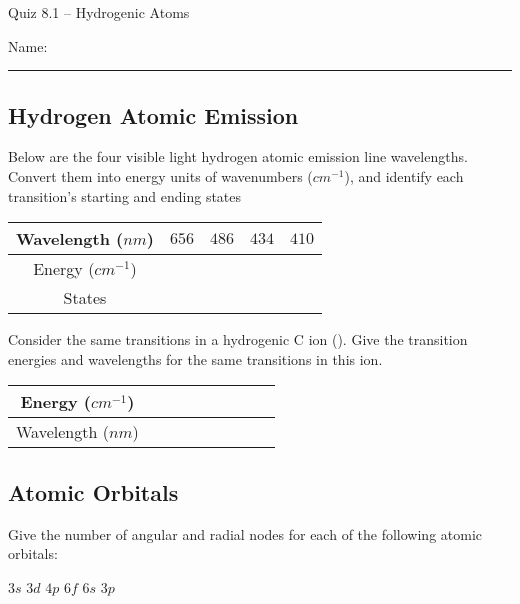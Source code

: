 \documentclass[11pt, letterpaper]{memoir}
\begin{document}
	\begin{center}
		{\large Quiz 8.1 --	Hydrogenic Atoms}
	\end{center}
	{\large Name: \rule[-1mm]{4in}{.1pt} 

\subsection*{Hydrogen Atomic Emission}

Below are the four visible light hydrogen atomic emission line wavelengths. Convert them into energy units of wavenumbers ($cm^{-1}$), and identify each transition's starting and ending states

\begin{tabular}{c|c|c|c|c}
	Wavelength ($nm$) & $656$ & $486$ & $434$ & $410$ \\ \midrule
	Energy ($cm^{-1}$) & ~\hspace{5em}~& ~\hspace{5em}~&~\hspace{5em}~ &~\hspace{5em}~ \\ \midrule
	States & ~\hspace{5em}~& ~\hspace{5em}~&~\hspace{5em}~ &~\hspace{5em}~
\end{tabular}

\noindent
Consider the same transitions in a hydrogenic C ion (). Give the transition energies and wavelengths for the same transitions in this ion.

\begin{tabular}{c|c|c|c|c}
	Energy ($cm^{-1}$) & &  & & \\ \midrule
	Wavelength ($nm$) & ~\hspace{5em}~& ~\hspace{5em}~&~\hspace{5em}~ &~\hspace{5em}~
\end{tabular}

\vspace{2em}
\subsection*{Atomic Orbitals}

Give the number of angular and radial nodes for each of the following atomic orbitals:

{\Large $3s$ \hspace{4em} $3d$ \hspace{4em} $4p$ \hspace{4em} $6f$ \hspace{4em} $6s$ \hspace{4em} $3p$}

}
\end{document}
